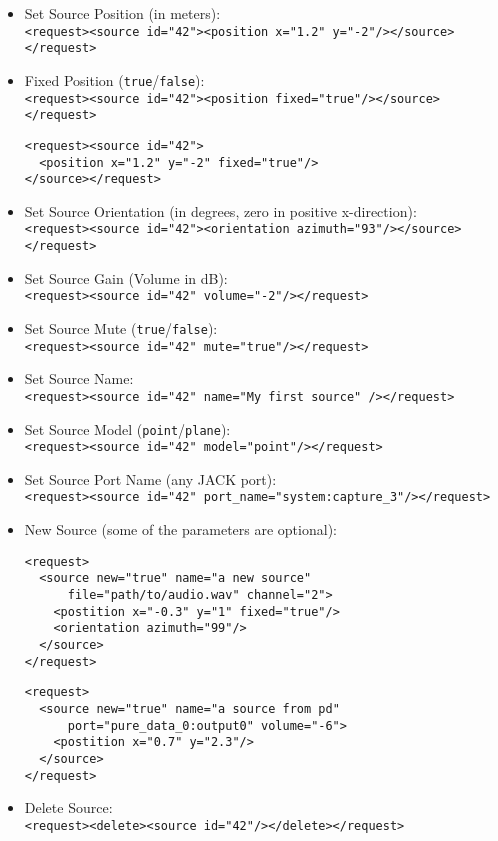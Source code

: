 \begin{itemize}
  \item Set Source Position (in meters):\\
    \verb|<request><source id="42"><position x="1.2" y="-2"/></source></request>|

  \item Fixed Position (\verb|true|/\verb|false|):\\
    \verb|<request><source id="42"><position fixed="true"/></source></request>|
    \begin{verbatim}
<request><source id="42">
  <position x="1.2" y="-2" fixed="true"/>
</source></request>
    \end{verbatim}

  \item Set Source Orientation (in degrees, zero in positive x-direction):\\
    \verb|<request><source id="42"><orientation azimuth="93"/></source></request>|

  \item Set Source Gain (Volume in dB):\\
    \verb|<request><source id="42" volume="-2"/></request>|

  \item Set Source Mute (\verb|true|/\verb|false|):\\
    \verb|<request><source id="42" mute="true"/></request>|

  \item Set Source Name:\\
    \verb|<request><source id="42" name="My first source" /></request>|

  \item Set Source Model (\verb|point|/\verb|plane|):\\
    \verb|<request><source id="42" model="point"/></request>|

  \item Set Source Port Name (any JACK port):\\
    \verb|<request><source id="42" port_name="system:capture_3"/></request>|

  \item New Source (some of the parameters are optional):
    \begin{verbatim}
<request>
  <source new="true" name="a new source"
      file="path/to/audio.wav" channel="2">
    <postition x="-0.3" y="1" fixed="true"/>
    <orientation azimuth="99"/>
  </source>
</request>
    \end{verbatim}
    \begin{verbatim}
<request>
  <source new="true" name="a source from pd"
      port="pure_data_0:output0" volume="-6">
    <postition x="0.7" y="2.3"/>
  </source>
</request>
    \end{verbatim}
  \item Delete Source:\\
    \verb|<request><delete><source id="42"/></delete></request>|
\end{itemize}

